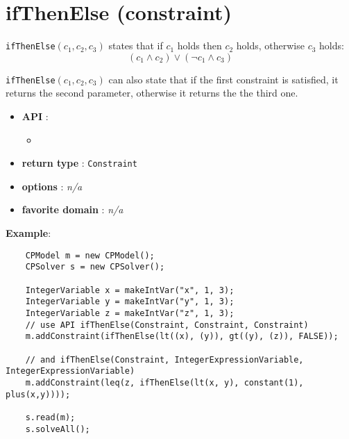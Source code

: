 \label{ifthenelse}
\hypertarget{ifthenelse}{}

\section{ifThenElse (constraint)}\label{ifthenelse:ifthenelseconstraint}\hypertarget{ifthenelse:ifthenelseconstraint}{}
\begin{notedef}
  \texttt{ifThenElse}$(c_1,c_2,c_3)$ states that if $c_1$ holds then $c_2$ holds, otherwise $c_3$ holds:
  $$(c_1\land c_2) \lor (\neg c_1 \land c_3)$$
\end{notedef}

\texttt{ifThenElse}$(c_1,c_2,c_3)$ can also state that if the first constraint is satisfied, it returns the second parameter, otherwise it returns the the third one.

\begin{itemize}
	\item \textbf{API} :
	\begin{itemize}
		\item {}
	\end{itemize}
	\item \textbf{return type} : \texttt{Constraint}
	\item \textbf{options} : \emph{n/a}
	\item \textbf{favorite domain} : \emph{n/a}
\end{itemize}

\textbf{Example}:

\begin{lstlisting}
	CPModel m = new CPModel();
	CPSolver s = new CPSolver();
	
	IntegerVariable x = makeIntVar("x", 1, 3);
	IntegerVariable y = makeIntVar("y", 1, 3);
	IntegerVariable z = makeIntVar("z", 1, 3);
	// use API ifThenElse(Constraint, Constraint, Constraint)
	m.addConstraint(ifThenElse(lt((x), (y)), gt((y), (z)), FALSE));
    
    // and ifThenElse(Constraint, IntegerExpressionVariable, IntegerExpressionVariable)
	m.addConstraint(leq(z, ifThenElse(lt(x, y), constant(1), plus(x,y))));
	
	s.read(m);
	s.solveAll();
\end{lstlisting}
